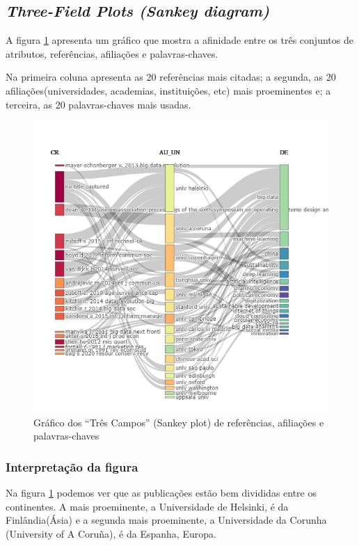 \subsection{\textit{Three-Field Plots (Sankey diagram)}}
A figura \ref{fig:g-tres} apresenta um gráfico que mostra a afinidade entre os três conjuntos de atributos,  referências, afiliações e palavras-chaves.

Na primeira coluna apresenta as 20 referências mais citadas; a segunda, as 20 afiliações(universidades, academias, instituições, etc) mais proeminentes e; a terceira, as 20 palavras-chaves mais usadas.

\begin{figure}[ht]
    \centering
    \includegraphics[width=12cm]{experiments/Tong00020/PesquisaBibliometrica/DataSet/MASSA@Tong00020-Three Fields Plot Affiliations References Keywords.png}
    \caption{Gráfico dos “Três Campos” (Sankey plot) de referências, afiliações e palavras-chaves}
    \label{fig:g-tres}
\end{figure}

\subsubsection{Interpretação da figura}
Na figura \ref{fig:g-tres} podemos ver que as publicações estão bem divididas entre os continentes. A mais proeminente, a Universidade de Helsinki, é da Finlândia(Ásia) e a segunda mais proeminente, a Universidade da Corunha (University of A Coruña), é da Espanha, Europa.

